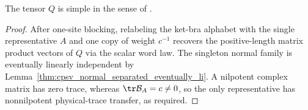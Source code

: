 \begin{lemma}%
    \label{thm:mpdo_dimer_bond_simple}
    \leanok
    The tensor $Q$ is simple in the sense of
    \cite[Definition~4.7]{Cirac2016MPDO_arXiv}.
\end{lemma}
\begin{proof}
    \leanok
    After one-site blocking, relabeling the ket-bra alphabet with the
    single representative $A$ and one copy of weight $c^{-1}$ recovers the
    positive-length matrix product vectors of $Q$ via the scalar word law.
    The singleton normal family is eventually linearly independent by
    Lemma~\ref{thm:cpsv_normal_separated_eventually_li}.
    A nilpotent complex matrix has zero trace, whereas
    $\tr\mathcal B_A=c\ne0$, so the only representative has
    nonnilpotent physical-trace transfer, as required.
\end{proof}
